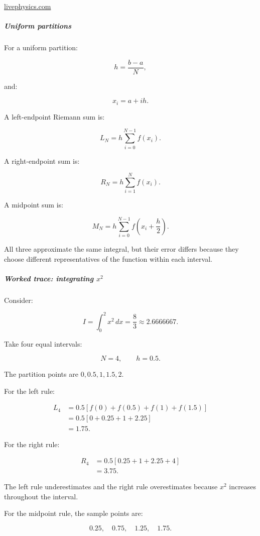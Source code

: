\href{https://livephysics.com/infographics/calculus-left-right-and-midpoint-riemann-sums/?utm_source=chatgpt.com}{livephysics.com}

\subparagraph{Uniform partitions}\label{uniform-partitions}

For a uniform partition:

\[
h=\frac{b-a}{N},
\]

and:

\[
x_i=a+ih.
\]

A left-endpoint Riemann sum is:

\[
L_N=h\sum_{i=0}^{N-1}f(x_i).
\]

A right-endpoint sum is:

\[
R_N=h\sum_{i=1}^{N}f(x_i).
\]

A midpoint sum is:

\[
M_N=h\sum_{i=0}^{N-1}f\left(x_i+\frac h2\right).
\]

All three approximate the same integral, but their error differs because they choose different representatives of the function within each interval.

\subparagraph{\texorpdfstring{Worked trace: integrating \(x^2\)}{Worked trace: integrating x\^{}2}}\label{worked-trace-integrating-x2}

Consider:

\[
I=\int_0^2x^2\,dx=\frac83\approx2.6666667.
\]

Take four equal intervals:

\[
N=4,\qquad h=0.5.
\]

The partition points are \(0,0.5,1,1.5,2\).

For the left rule:

\[
\begin{aligned} L_4 &=0.5[f(0)+f(0.5)+f(1)+f(1.5)]\\ &=0.5[0+0.25+1+2.25]\\ &=\boxed{1.75}. \end{aligned}
\]

For the right rule:

\[
\begin{aligned} R_4 &=0.5[0.25+1+2.25+4]\\ &=\boxed{3.75}. \end{aligned}
\]

The left rule underestimates and the right rule overestimates because \(x^2\) increases throughout the interval.

For the midpoint rule, the sample points are:

\[
0.25,\quad0.75,\quad1.25,\quad1.75.
\]

